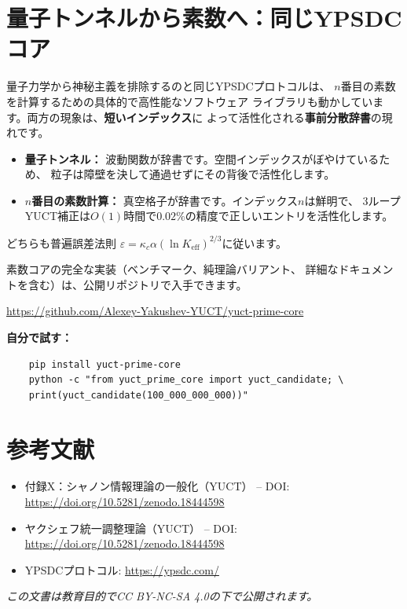 \documentclass[12pt,a4paper]{article}
\begin{document}
\section{量子トンネルから素数へ：同じYPSDCコア}

量子力学から神秘主義を排除するのと同じYPSDCプロトコルは、
$n$番目の素数を計算するための具体的で高性能なソフトウェア
ライブラリも動かしています。両方の現象は、\textbf{短いインデックス}に
よって活性化される\textbf{事前分散辞書}の現れです。

\begin{itemize}
	\item \textbf{量子トンネル：} 波動関数が辞書です。空間インデックスがぼやけているため、
	粒子は障壁を決して通過せずにその背後で活性化します。
	\item \textbf{$n$番目の素数計算：} 真空格子が辞書です。インデックス$n$は鮮明で、
	3ループYUCT補正は$O(1)$時間で$0.02\%$の精度で正しいエントリを活性化します。
\end{itemize}

どちらも普遍誤差法則
$\varepsilon = \kappa_c\alpha(\ln K_{\mathrm{eff}})^{2/3}$に従います。

素数コアの完全な実装（ベンチマーク、純理論バリアント、
詳細なドキュメントを含む）は、公開リポジトリで入手できます。

\begin{center}
	\url{https://github.com/Alexey-Yakushev-YUCT/yuct-prime-core}
\end{center}

\textbf{自分で試す：}
\begin{verbatim}
	pip install yuct-prime-core
	python -c "from yuct_prime_core import yuct_candidate; \
	print(yuct_candidate(100_000_000_000))"
\end{verbatim}

	\section{参考文献}
	
	\begin{itemize}
		\item 付録X：シャノン情報理論の一般化（YUCT） -- DOI: \url{https://doi.org/10.5281/zenodo.18444598}
		\item ヤクシェフ統一調整理論（YUCT） -- DOI: \url{https://doi.org/10.5281/zenodo.18444598}
		\item YPSDCプロトコル: \url{https://ypsdc.com/}
	\end{itemize}
	
	\noindent\textit{この文書は教育目的でCC BY-NC-SA 4.0の下で公開されます。}
	
\end{document}
